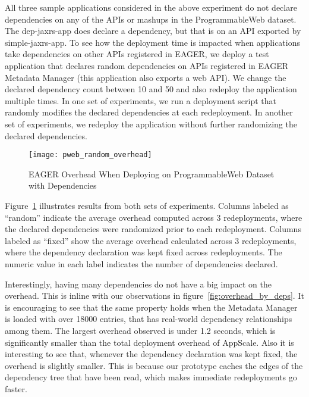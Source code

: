 All three sample applications considered in the above experiment do not declare dependencies on any of the APIs or mashups in the ProgrammableWeb
dataset. The dep-jaxrs-app does declare a dependency, but that is on an API exported by simple-jaxrs-app. To see how the deployment time is impacted
when applications take dependencies on other APIs registered in EAGER, we deploy a test application that declares random dependencies on APIs
registered in EAGER Metadata Manager (this application also exports a web API). We change the declared dependency count between 
10 and 50 and also redeploy the application multiple times.
In one set of experiments, we run a deployment script that randomly modifies the declared dependencies at each redeployment. In another set of 
experiments, we redeploy the application without further randomizing the declared dependencies.

\begin{figure}
\centering
\texttt{[image: pweb\_random\_overhead]}
\caption{EAGER Overhead When Deploying on ProgrammableWeb Dataset with Dependencies}
\label{fig:pweb_random_overhead}
\end{figure}

Figure~\ref{fig:pweb_random_overhead} illustrates results from both sets of experiments. Columns labeled as ``random'' indicate the average overhead
computed across 3 redeployments, where the declared dependencies were randomized prior to each redeployment. Columns labeled as ``fixed'' show
the average overhead calculated across 3 redeployments, where the dependency declaration was kept fixed across redeployments. The numeric value
in each label indicates the number of dependencies declared.

Interestingly, having many dependencies do not have a big impact on the overhead. This is inline with our observations in figure~\ref{fig:overhead_by_deps}.
It is encouraging to see that the same property holds when the Metadata Manager is loaded with over 18000 entries, that has real-world dependency
relationships among them. The largest overhead observed is under 1.2 seconds, which is significantly smaller than the total deployment overhead of AppScale.
Also it is interesting to see that, whenever the dependency declaration was kept fixed, the overhead is slightly smaller. This is because our prototype caches
the edges of the dependency tree that have been read, which makes immediate redeployments go faster.